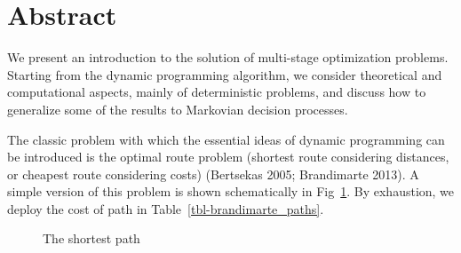 \documentclass[
  letterpaper,
  DIV=11,
  numbers=noendperiod]{scrreprt}
\theoremstyle{definition}
\theoremstyle{remark}
\begin{document}

\chapter*{Abstract}\label{abstract-1}


We present an introduction to the solution of multi-stage optimization
problems. Starting from the dynamic programming algorithm, we consider
theoretical and computational aspects, mainly of deterministic problems,
and discuss how to generalize some of the results to Markovian decision
processes.

The classic problem with which the essential ideas of dynamic
programming can be introduced is the optimal route problem (shortest
route considering distances, or cheapest route considering costs)
(Bertsekas 2005; Brandimarte 2013). A simple version of this problem is
shown schematically in Fig~\ref{fig-brandimarte_net}. By exhaustion, we
deploy the cost of path in Table~\ref{tbl-brandimarte_paths}.

\begin{figure}


\caption{\label{fig-brandimarte_net}The shortest path}

\end{figure}%
\end{document}

